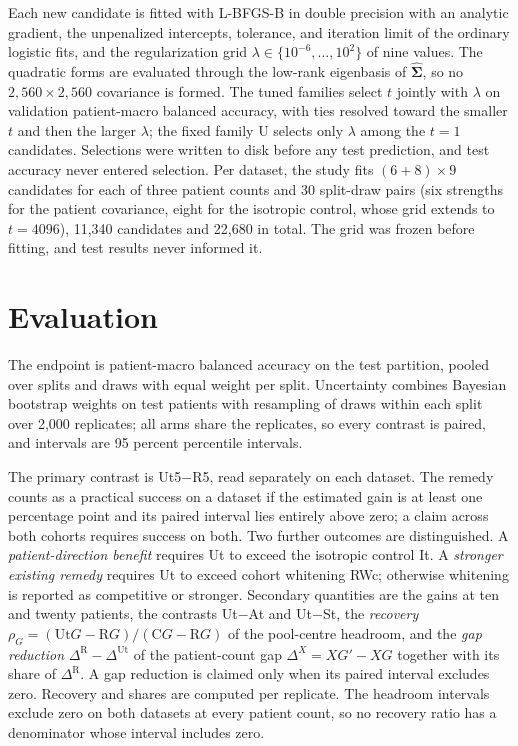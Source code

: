 \documentclass[11pt]{article}
\begin{document}
\noindent Each new candidate is fitted with L-BFGS-B in double precision with an analytic gradient, the unpenalized intercepts, tolerance, and iteration limit of the ordinary logistic fits, and the regularization grid $\lambda\in\{10^{-6},\dots,10^{2}\}$ of nine values. The quadratic forms are evaluated through the low-rank eigenbasis of $\hat{\boldsymbol\Sigma}$, so no $2{,}560\times2{,}560$ covariance is formed. The tuned families select $t$ jointly with $\lambda$ on validation patient-macro balanced accuracy, with ties resolved toward the smaller $t$ and then the larger $\lambda$; the fixed family U selects only $\lambda$ among the $t=1$ candidates. Selections were written to disk before any test prediction, and test accuracy never entered selection. Per dataset, the study fits $(6+8)\times9$ candidates for each of three patient counts and 30 split-draw pairs (six strengths for the patient covariance, eight for the isotropic control, whose grid extends to $t=4096$), 11,340 candidates and 22,680 in total. The grid was frozen before fitting, and test results never informed it.

\section{Evaluation}
\label{sec:evaluation}
The endpoint is patient-macro balanced accuracy on the test partition, pooled over splits and draws with equal weight per split. Uncertainty combines Bayesian bootstrap weights on test patients \citep{rubin1981bayesian} with resampling of draws within each split over 2,000 replicates; all arms share the replicates, so every contrast is paired, and intervals are 95 percent percentile intervals.

The primary contrast is Ut5$-$R5, read separately on each dataset. The remedy counts as a practical success on a dataset if the estimated gain is at least one percentage point and its paired interval lies entirely above zero; a claim across both cohorts requires success on both. Two further outcomes are distinguished. A \emph{patient-direction benefit} requires Ut to exceed the isotropic control It. A \emph{stronger existing remedy} requires Ut to exceed cohort whitening RWc; otherwise whitening is reported as competitive or stronger. Secondary quantities are the gains at ten and twenty patients, the contrasts Ut$-$At and Ut$-$St, the \emph{recovery} $\rho_G=(\mathrm{Ut}G-\mathrm RG)/(\mathrm CG-\mathrm RG)$ of the pool-centre headroom, and the \emph{gap reduction} $\Delta^{\mathrm R}-\Delta^{\mathrm{Ut}}$ of the patient-count gap $\Delta^X=XG'-XG$ together with its share of $\Delta^{\mathrm R}$. A gap reduction is claimed only when its paired interval excludes zero. Recovery and shares are computed per replicate. The headroom intervals exclude zero on both datasets at every patient count, so no recovery ratio has a denominator whose interval includes zero.





\end{document}
